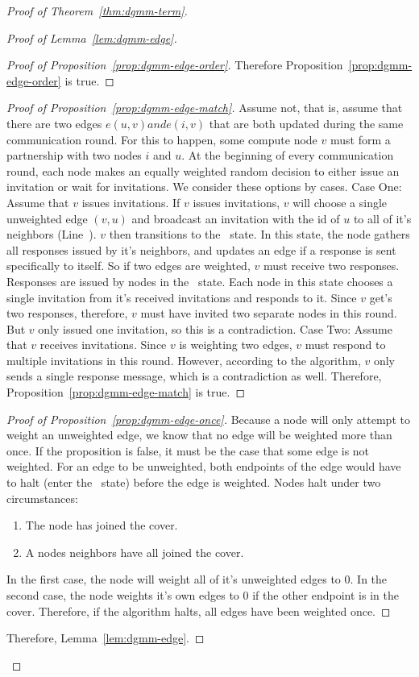 \begin{proof}[Proof of Theorem~\ref{thm:dgmm-term}]
\begin{proof}[Proof of Lemma~\ref{lem:dgmm-edge}]
\begin{proof}[Proof of Proposition~\ref{prop:dgmm-edge-order}]
    Therefore Proposition~\ref{prop:dgmm-edge-order} is true.
  \end{proof}
  \begin{proof}[Proof of Proposition~\ref{prop:dgmm-edge-match}]
    Assume not, that is, assume that there are two edges $e(u,v) and e(i,v)$ that are both updated during the same communication round. For this to happen, some compute node $v$ must form a partnership with two nodes $i$ and $u$. 
    At the beginning of every communication round, each node makes an equally weighted random decision to either issue an invitation or wait for invitations. We consider these options by cases.
    Case One: Assume that $v$ issues invitations. If $v$ issues invitations, $v$ will choose a single unweighted edge $(v,u)$ and broadcast an invitation with the id of $u$ to all of it's neighbors (Line~). $v$ then transitions to the \cWd\ state. In this state, the node gathers all responses issued by it's neighbors, and updates an edge if a response is sent specifically to itself.
    So if two edges are weighted, $v$ must receive two responses.
    Responses are issued by nodes in the \cRd\ state. Each node in this state chooses a single invitation from it's received invitations and responds to it. Since $v$ get's two responses, therefore, $v$ must have invited two separate nodes in this round. But $v$ only issued one invitation, so this is a contradiction.
    Case Two: Assume that $v$ receives invitations. Since $v$ is weighting two edges, $v$ must respond to multiple invitations in this round. However, according to the algorithm, $v$ only sends a single response message, which is a contradiction as well.
    Therefore, Proposition~\ref{prop:dgmm-edge-match} is true.
  \end{proof}
  \begin{proof}[Proof of Proposition~\ref{prop:dgmm-edge-once}]
    Because a node will only attempt to weight an unweighted edge, we know that no edge will be weighted more than once. If the proposition is false, it must be the case that some edge is not weighted.
    For an edge to be unweighted, both endpoints of the edge would have to halt (enter the \cDd\ state) before the edge is weighted. Nodes halt under two circumstances:
    \begin{enumerate}
    \item The node has joined the cover.
    \item A nodes neighbors have all joined the cover.
    \end{enumerate}
    In the first case, the node will weight all of it's unweighted edges to 0. In the second case, the node weights it's own edges to 0 if the other endpoint is in the cover.
    Therefore, if the algorithm halts, all edges have been weighted once.
  \end{proof}
  Therefore, Lemma~\ref{lem:dgmm-edge}.
\end{proof}


\end{proof}
